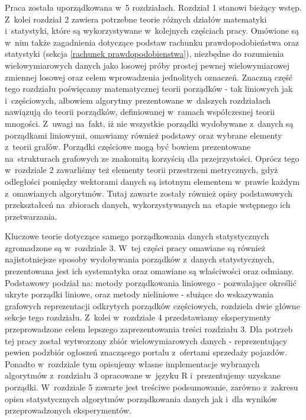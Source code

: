 \documentclass[12pt,a4paper]{report}
\begin{document}
Praca została uporządkowana w~5 rozdziałach. Rozdział 1 stanowi bieżący wstęp. Z~kolei rozdział 2 zawiera potrzebne teorie różnych działów matematyki i~statystyki, które są wykorzystywane w~kolejnych częściach pracy. Omówione są w~nim także zagadnienia dotyczące podstaw rachunku prawdopodobieństwa oraz statystyki (sekcja \ref{rachunek prawdopodobienstwa}), niezbędne do rozumienia wielowymiarowych danych jako losowej próby prostej pewnej wielowymiarowej zmiennej losowej oraz celem wprowadzenia jednolitych oznaczeń. Znaczną część tego rozdziału poświęcamy matematycznej teorii porządków - tak liniowych jak i~częściowych, albowiem algorytmy prezentowane w~dalszych rozdziałach nawiązują do teorii porządków, definiowanej w~ramach współczesnej teorii mnogości. Z~uwagi na~fakt, iż nie wszystkie porządki wydobywane z~danych są porządkami liniowymi, omawiamy również podstawy oraz wybrane elementy z~teorii grafów. Porządki częściowe mogą być bowiem prezentowane na~strukturach grafowych ze znakomitą korzyścią dla przejrzystości. Oprócz tego w~rozdziale 2 zawarliśmy też elementy teorii przestrzeni metrycznych, gdyż odległości pomiędzy wektorami danych są istotnym elementem w~prawie każdym z~omawianych algorytmów. Tutaj zawarte zostały również opisy podstawowych przekształceń na~zbiorach danych, wykorzystywanych na~etapie wstępnego ich przetwarzania.

Kluczowe teorie dotyczące samego porządkowania danych statystycznych zgromadzone są w~rozdziale 3. W~tej części pracy omawiane są również najistotniejsze sposoby wydobywania porządków z~danych statystycznych, prezentowana jest ich systematyka oraz omawiane są właściwości oraz odmiany. Podstawowy podział na: metody porządkowania liniowego - pozwalające określić ukryte porządki liniowe, oraz metody nieliniowe - służące do wskazywania grafowych reprezentacji odkrytych porządków częściowych, rozdziela dwie główne sekcje tego rozdziału. Z~kolei w~rozdziale 4 przedstawiamy eksperymenty przeprowadzone celem lepszego zaprezentowania treści rozdziału 3. Dla potrzeb tej pracy został wytworzony zbiór wielowymiarowych danych - reprezentujący pewien podzbiór ogłoszeń znaczącego portalu z~ofertami sprzedaży pojazdów. Ponadto w~rozdziale tym opisujemy własne implementacje wybranych algorytmów z~rozdziału 3 opracowane w~języku R i~prezentujemy uzyskane porządki. W~rozdziale 5 zawarte jest treściwe podsumowanie, zarówno z~zakresu opisu statystycznych algorytmów porządkowania danych jak i~dla wyników przeprowadzonych eksperymentów.
\end{document}
